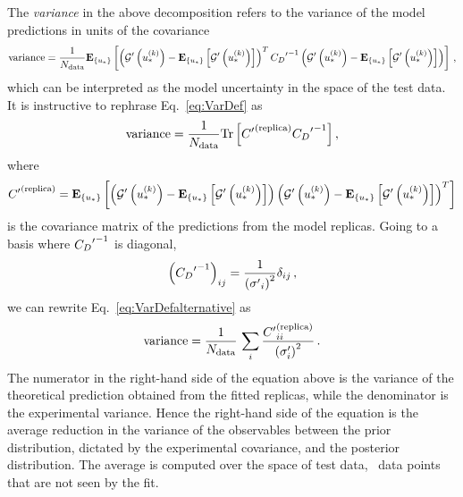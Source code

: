 The {\em variance} in the above decomposition refers to the variance of the
model predictions in units of the covariance
\begin{equation}
    \label{eq:VarDef}
    {\rm variance} = \frac{1}{N_{\rm data}}
    \mathbf{E}_{\{ u_* \}} \left[ 
            \left( {{\mathcal{G}}^{\prime}}\left(u_*^{(k)}\right) - 
            \mathbf{E}_{\{ u_* \}} \left[ {{\mathcal{G}}^{\prime}}\left(u_*^{(k)}\right) \right] \right)^T
            {{C_{D}}^{\prime}}^{-1}
            \left( {{\mathcal{G}}^{\prime}}\left(u_*^{(k)}\right) - 
            \mathbf{E}_{\{ u_* \}} \left[ {{\mathcal{G}}^{\prime}}\left(u_*^{(k)}\right) \right] \right)
         \right]\, ,
\end{equation}
which can be interpreted as the model uncertainty in the space of the test data.
It is instructive to rephrase Eq.~\ref{eq:VarDef} as
\begin{equation}
    \label{eq:VarDefalternative}
    {\rm variance} = \frac{1}{N_{\rm data}} {\rm Tr} \left[ {{C}^{\prime}}^{(\rm replica)} {{C_{D}}^{\prime}}^{-1} \right],
\end{equation}
where 
\begin{equation}
    \label{eq:CovRep}
    {{C}^{\prime}}^{(\rm replica)} = 
    \mathbf{E}_{\{ u_* \}} \left[ 
            \left( {{\mathcal{G}}^{\prime}}\left(u_*^{(k)}\right) - 
            \mathbf{E}_{\{ u_* \}} \left[ {{\mathcal{G}}^{\prime}}\left(u_*^{(k)}\right) \right] \right)
            \left( {{\mathcal{G}}^{\prime}}\left(u_*^{(k)}\right) - 
            \mathbf{E}_{\{ u_* \}} \left[ {{\mathcal{G}}^{\prime}}\left(u_*^{(k)}\right) \right] \right)^T
         \right]
\end{equation}
is the covariance matrix of the predictions from the model replicas. Going to a
basis where ${{C_{D}}^{\prime}}^{-1}$ is diagonal,
\begin{equation}
    \label{eq:InvCovPrimeDiag}
    \left({{C_{D}}^{\prime}}^{-1} \right)_{ij} = \frac{1}{\left({{\sigma}^{\prime}}_i\right)^2} 
    \delta_{ij}\, ,
\end{equation}
we can rewrite Eq.~\ref{eq:VarDefalternative} as 
\begin{equation}
    \label{eq:VarianceInterpretation}
    {\rm variance} = \frac{1}{N_{\rm data}}\, \sum_i \frac{{{C}^{\prime}}^{(\rm replica)}_{ii}}{\left(\sigma'_i\right)^2}\, .
\end{equation}
The numerator in the right-hand side of the equation above is the variance of
the theoretical prediction obtained from the fitted replicas, while the
denominator is the experimental variance. Hence the right-hand side of the
equation is the average reduction in the variance of the observables between the
prior distribution, dictated by the experimental covariance, and the posterior
distribution. The average is computed over the space of test data, \ie\ data points that are not seen by the fit. 

